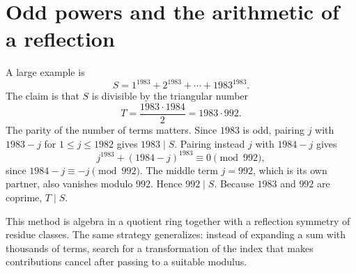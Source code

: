 \section{Odd powers and the arithmetic of a reflection}

A large example is
\[
 S=1^{1983}+2^{1983}+\cdots+1983^{1983}.
\]
The claim is that \(S\) is divisible by the triangular number
\[
 T=\frac{1983\cdot1984}{2}=1983\cdot992.
\]
The parity of the number of terms matters. Since \(1983\) is odd, pairing \(j\) with \(1983-j\) for \(1\le j\le1982\) gives \(1983\mid S\). Pairing instead \(j\) with \(1984-j\) gives
\[
 j^{1983}+(1984-j)^{1983}\equiv0\pmod{992},
\]
since \(1984-j\equiv-j\pmod{992}\). The middle term \(j=992\), which is its own partner, also vanishes modulo \(992\). Hence \(992\mid S\). Because \(1983\) and \(992\) are coprime, \(T\mid S\).

This method is algebra in a quotient ring together with a reflection symmetry of residue classes. The same strategy generalizes: instead of expanding a sum with thousands of terms, search for a transformation of the index that makes contributions cancel after passing to a suitable modulus.
